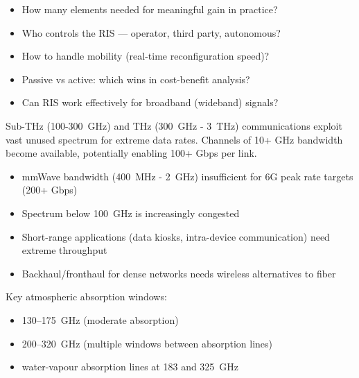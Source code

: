 
\begin{itemize}
\tightlist
\item
  How many elements needed for meaningful gain in practice?
\item
  Who controls the RIS — operator, third party, autonomous?
\item
  How to handle mobility (real-time reconfiguration speed)?
\item
  Passive vs active: which wins in cost-benefit analysis?
\item
  Can RIS work effectively for broadband (wideband) signals?
\end{itemize}



\CNchained{}

\CNchained{}

Sub-THz (100-300~GHz) and THz (300~GHz - 3~THz) communications exploit vast unused spectrum for extreme data rates. Channels of 10+ GHz bandwidth become available, potentially enabling 100+ Gbps per link.


\begin{itemize}
\tightlist
\item
  mmWave bandwidth (400~MHz - 2~GHz) insufficient for 6G peak rate targets (200+ Gbps)
\item
  Spectrum below 100~GHz is increasingly congested
\item
  Short-range applications (data kiosks, intra-device communication) need extreme throughput
\item
  Backhaul/\allowbreak{}fronthaul for dense networks needs wireless alternatives to fiber
\end{itemize}




Key atmospheric absorption windows:

\begin{itemize}
\tightlist
\item
  130–175~GHz (moderate absorption)
\item
  200–320~GHz (multiple windows between absorption lines)
\item
  water-vapour absorption lines at 183 and 325~GHz
\end{itemize}

